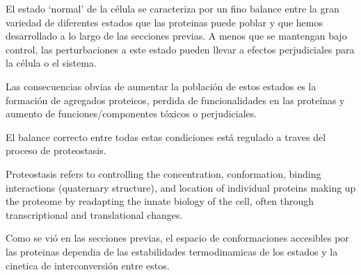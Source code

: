 El estado `normal'{} de la célula se caracteriza por un fino balance entre la gran variedad de diferentes estados que las proteinas puede poblar y que hemos desarrollado a lo largo de las secciones previas.
A menos que se mantengan bajo control, las perturbaciones a este estado pueden llevar a efectos perjudiciales para la célula o el sistema. 

Las consecuencias obvias de aumentar la población de estos estados es la formación de agregados proteicos, perdida de funcionalidades en las proteínas y aumento de funciones/componentes tóxicos o perjudiciales.

El balance correcto entre todas estas condiciones está regulado a traves del proceso de proteostasis.

Proteostasis refers to controlling the concentration, conformation, binding interactions (quaternary structure), and location of individual proteins making up the proteome by readapting the innate biology of the cell, 
often through transcriptional and translational changes.

Como se vió en las secciones previas, el espacio de conformaciones accesibles por las proteinas dependia de las estabilidades termodinamicas de los estados y la cinetica de interconversión entre estos. 

